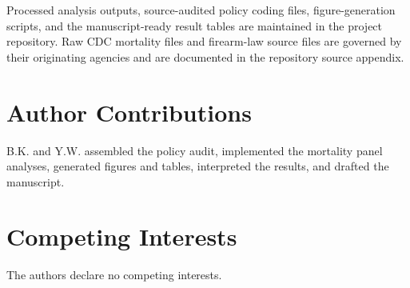 \documentclass[11pt]{article}
\begin{document}
Processed analysis outputs, source-audited policy coding files, figure-generation scripts, and the manuscript-ready result tables are maintained in the project repository. Raw CDC mortality files and firearm-law source files are governed by their originating agencies and are documented in the repository source appendix.

\section*{Author Contributions}

B.K. and Y.W. assembled the policy audit, implemented the mortality panel analyses, generated figures and tables, interpreted the results, and drafted the manuscript.

\section*{Competing Interests}

The authors declare no competing interests.



\end{document}
